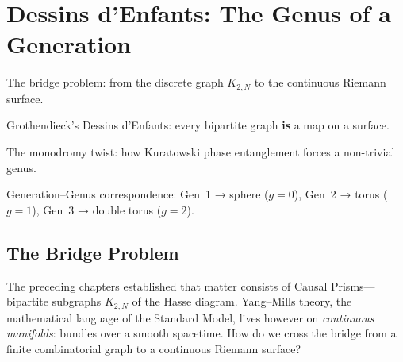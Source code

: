 \chapter{Dessins d'Enfants: The Genus of a Generation}
\label{ch:dessins}

\begin{introduction}
  \item The bridge problem: from the discrete graph $K_{2,N}$ to the
        continuous Riemann surface.
  \item Grothendieck's Dessins d'Enfants: every bipartite graph
        \textbf{is} a map on a surface.
  \item The monodromy twist: how Kuratowski phase entanglement
        forces a non-trivial genus.
  \item Generation--Genus correspondence: Gen~1 → sphere ($g=0$),
        Gen~2 → torus ($g=1$), Gen~3 → double torus ($g=2$).
\end{introduction}

\section{The Bridge Problem}

The preceding chapters established that matter consists of
Causal Prisms---bipartite subgraphs $K_{2,N}$ of the Hasse diagram.
Yang--Mills theory, the mathematical language of the Standard Model,
lives however on \emph{continuous manifolds}: bundles over a smooth
spacetime. How do we cross the bridge from a finite combinatorial graph
to a continuous Riemann surface?

